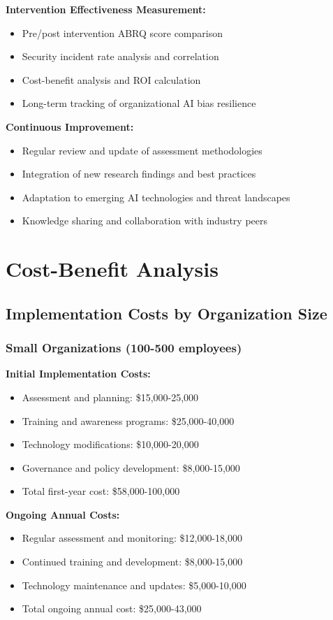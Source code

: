 \documentclass[11pt,a4paper]{article}
\begin{document}
\textbf{Intervention Effectiveness Measurement:}
\begin{itemize}
\item Pre/post intervention ABRQ score comparison
\item Security incident rate analysis and correlation
\item Cost-benefit analysis and ROI calculation
\item Long-term tracking of organizational AI bias resilience
\end{itemize}

\textbf{Continuous Improvement:}
\begin{itemize}
\item Regular review and update of assessment methodologies
\item Integration of new research findings and best practices
\item Adaptation to emerging AI technologies and threat landscapes
\item Knowledge sharing and collaboration with industry peers
\end{itemize}

\section{Cost-Benefit Analysis}

\subsection{Implementation Costs by Organization Size}

\subsubsection{Small Organizations (100-500 employees)}

\textbf{Initial Implementation Costs:}
\begin{itemize}
\item Assessment and planning: \$15,000-25,000
\item Training and awareness programs: \$25,000-40,000
\item Technology modifications: \$10,000-20,000
\item Governance and policy development: \$8,000-15,000
\item Total first-year cost: \$58,000-100,000
\end{itemize}

\textbf{Ongoing Annual Costs:}
\begin{itemize}
\item Regular assessment and monitoring: \$12,000-18,000
\item Continued training and development: \$8,000-15,000
\item Technology maintenance and updates: \$5,000-10,000
\item Total ongoing annual cost: \$25,000-43,000
\end{itemize}
\end{document}
